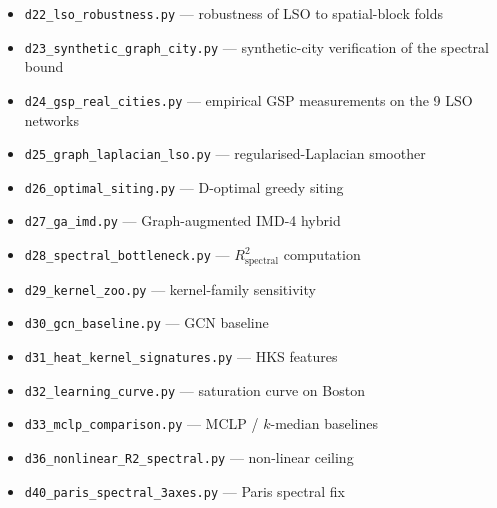 \documentclass[11pt,a4paper]{article}
\begin{document}
\begin{itemize}[leftmargin=*,itemsep=0pt]
\item \texttt{d22\_lso\_robustness.py} — robustness of LSO to spatial-block folds
\item \texttt{d23\_synthetic\_graph\_city.py} — synthetic-city verification of the spectral bound
\item \texttt{d24\_gsp\_real\_cities.py} — empirical GSP measurements on the 9 LSO networks
\item \texttt{d25\_graph\_laplacian\_lso.py} — regularised-Laplacian smoother
\item \texttt{d26\_optimal\_siting.py} — D-optimal greedy siting
\item \texttt{d27\_ga\_imd.py} — Graph-augmented IMD-4 hybrid
\item \texttt{d28\_spectral\_bottleneck.py} — $R^2_{\mathrm{spectral}}$ computation
\item \texttt{d29\_kernel\_zoo.py} — kernel-family sensitivity
\item \texttt{d30\_gcn\_baseline.py} — GCN baseline
\item \texttt{d31\_heat\_kernel\_signatures.py} — HKS features
\item \texttt{d32\_learning\_curve.py} — saturation curve on Boston
\item \texttt{d33\_mclp\_comparison.py} — MCLP / $k$-median baselines
\item \texttt{d36\_nonlinear\_R2\_spectral.py} — non-linear ceiling
\item \texttt{d40\_paris\_spectral\_3axes.py} — Paris spectral fix
\end{itemize}


\end{document}
